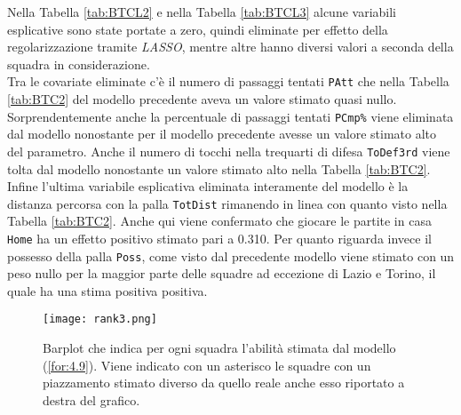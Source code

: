 Nella Tabella \ref{tab:BTCL2} e nella Tabella \ref{tab:BTCL3} alcune variabili esplicative sono state portate a zero, quindi eliminate per effetto della regolarizzazione tramite \emph{LASSO}, mentre altre hanno diversi valori a seconda della squadra in considerazione. \\
Tra le covariate eliminate c'è il numero di passaggi tentati \texttt{PAtt} che nella Tabella \ref{tab:BTC2} del modello precedente aveva un valore stimato quasi nullo. Sorprendentemente anche la percentuale di passaggi tentati \texttt{PCmp\%} viene eliminata dal modello nonostante per il modello precedente avesse un valore stimato alto del parametro. Anche il numero di tocchi nella trequarti di difesa \texttt{ToDef3rd} viene tolta dal modello nonostante un valore stimato alto nella Tabella \ref{tab:BTC2}. Infine l'ultima variabile esplicativa eliminata interamente del modello è la distanza percorsa con la palla \texttt{TotDist} rimanendo in linea con quanto visto nella Tabella \ref{tab:BTC2}.
Anche qui viene confermato che giocare le partite in casa \texttt{Home} ha un effetto positivo stimato pari a 0.310. Per quanto riguarda invece il possesso della palla \texttt{Poss}, come visto dal precedente modello viene stimato con un peso nullo per la maggior parte delle squadre ad eccezione di Lazio e Torino, il quale ha una stima positiva positiva.

\begin{sidewaysfigure} 
	\centering
	\begin{center}
		\texttt{[image: rank3.png]}
		\caption{Barplot che indica per ogni squadra l'abilità stimata dal modello (\ref{for:4.9}). Viene indicato con un asterisco le squadre con un piazzamento stimato diverso da quello reale anche esso riportato a destra del grafico.} \label{tab:BTCL} 
	\end{center}
\end{sidewaysfigure}

